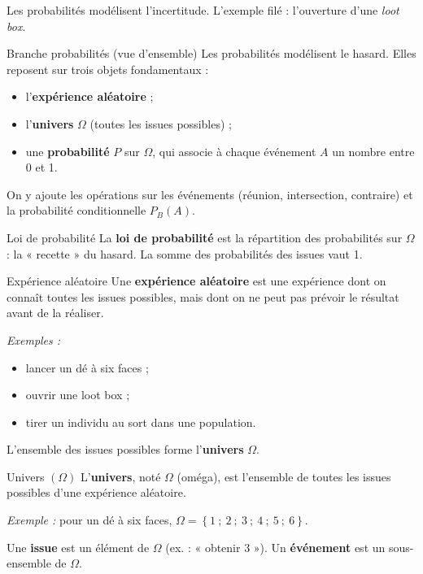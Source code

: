 \documentclass[11pt,a4paper]{article}
\begin{document}
	Les probabilités modélisent l'incertitude. L'exemple filé : l'ouverture d'une
	\emph{loot box}.
	
	\begin{ficheprobas}{Branche probabilités (vue d'ensemble)}
		Les probabilités modélisent le hasard. Elles reposent sur trois objets
		fondamentaux :
		\begin{itemize}
			\item l'\textbf{expérience aléatoire} ;
			\item l'\textbf{univers} $\Omega$ (toutes les issues possibles) ;
			\item une \textbf{probabilité} $P$ sur $\Omega$, qui associe à chaque
			événement $A$ un nombre entre 0 et 1.
		\end{itemize}
		On y ajoute les opérations sur les événements (réunion, intersection, contraire)
		et la probabilité conditionnelle $P_B\left(A\right)$.
	\end{ficheprobas}
	
	\begin{ficheprobas}{Loi de probabilité}
		La \textbf{loi de probabilité} est la répartition des probabilités sur
		$\Omega$ : la « recette » du hasard. La somme des probabilités des issues vaut
		1.
	\end{ficheprobas}
	
	\begin{ficheprobas}{Expérience aléatoire}
		Une \textbf{expérience aléatoire} est une expérience dont on connaît toutes les
		issues possibles, mais dont on ne peut pas prévoir le résultat avant de la
		réaliser.
		
		\emph{Exemples :}
		\begin{itemize}
			\item lancer un dé à six faces ;
			\item ouvrir une loot box ;
			\item tirer un individu au sort dans une population.
		\end{itemize}
		L'ensemble des issues possibles forme l'\textbf{univers} $\Omega$.
	\end{ficheprobas}
	
	\begin{ficheprobas}{Univers $\left(\Omega\right)$}
		L'\textbf{univers}, noté $\Omega$ (oméga), est l'ensemble de toutes les issues
		possibles d'une expérience aléatoire.
		
		\emph{Exemple :} pour un dé à six faces,
		$\Omega = \left\{1\ ;\ 2\ ;\ 3\ ;\ 4\ ;\ 5\ ;\ 6\right\}$.
		
		Une \textbf{issue} est un élément de $\Omega$ (ex. : « obtenir 3 »). Un
		\textbf{événement} est un sous-ensemble de $\Omega$.
	\end{ficheprobas}
	
\end{document}
